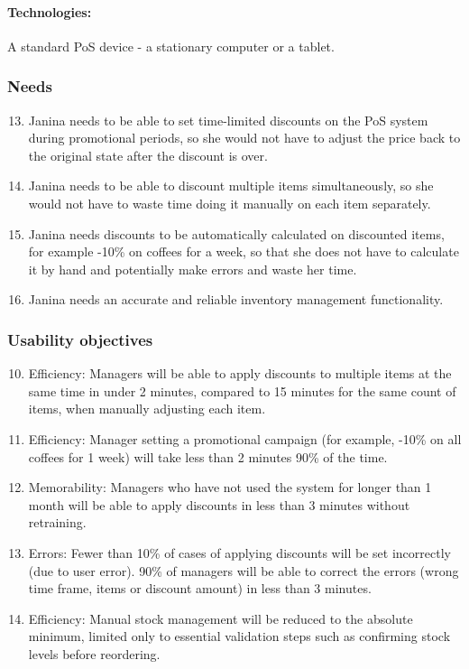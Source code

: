 \documentclass{article}
\begin{document}
\paragraph{\small Technologies:} A standard PoS device - a stationary computer or a tablet.


\subsubsection{Needs}
\label{N13-16}
\begin{enumerate}[label=N\arabic*.]
\setcounter{enumi}{12}
    \item Janina needs to be able to set time-limited discounts on the PoS system during promotional periods, so she would not have to adjust the price back to the original state after the discount is over.
    \item Janina needs to be able to discount multiple items simultaneously, so she would not have to waste time doing it manually on each item separately.
    \item Janina needs discounts to be automatically calculated on discounted items, for example -10\% on coffees for a week, so that she does not have to calculate it by hand and potentially make errors and waste her time.
    \item Janina needs an accurate and reliable inventory management functionality.
\end{enumerate}

\subsubsection{Usability objectives}
\begin{enumerate}[label=UO\arabic*.]
\setcounter{enumi}{9}
    \item Efficiency: Managers will be able to apply discounts to multiple items at the same time in under 2 minutes, compared to 15 minutes for the same count of items, when manually adjusting each item.
    \item Efficiency: Manager setting a promotional campaign (for example, -10\% on all coffees for 1 week) will take less than 2 minutes 90\% of the time.
    \item Memorability: Managers who have not used the system for longer than 1 month will be able to apply discounts in less than 3 minutes without retraining.
    \item Errors: Fewer than 10\% of cases of applying discounts will be set incorrectly (due to user error). 90\% of managers will be able to correct the errors (wrong time frame, items or discount amount) in less than 3 minutes.
    \item Efficiency: Manual stock management will be reduced to the absolute minimum, limited only to essential validation steps such as confirming stock levels before reordering.
\end{enumerate}
\end{document}

